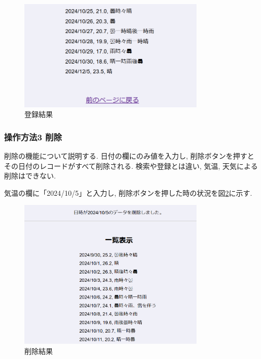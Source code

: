 \documentclass{ltjsarticle} %
\begin{document}
\begin{figure}[H] %
  \centering
  \includegraphics[width=0.8\textwidth]{6.png} %
  \caption{登録結果} %
  \label{fig:6} %
\end{figure}

\subsubsection{操作方法3 削除}
削除の機能について説明する. 日付の欄にのみ値を入力し, 削除ボタンを押すとその日付のレコードがすべて削除される. 
検索や登録とは違い, 気温, 天気による削除はできない. 

気温の欄に「2024/10/5」と入力し, 削除ボタンを押した時の状況を図\ref{fig:7}に示す. 

\begin{figure}[H] %
  \centering
  \includegraphics[width=0.8\textwidth]{7.png} %
  \caption{削除結果} %
  \label{fig:7} %
\end{figure}
\end{document}
